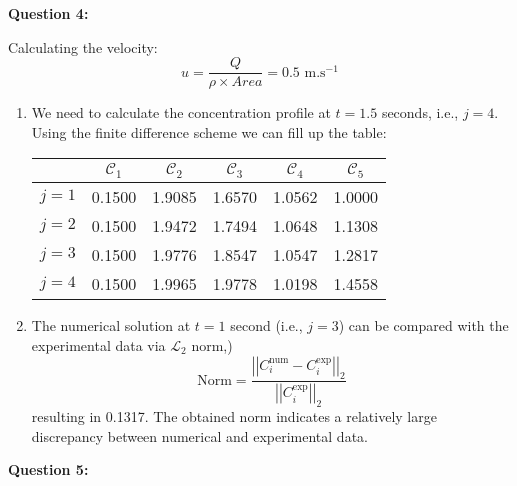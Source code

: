 \documentclass[12pts,a4paper,amsmath,amssymb,floatfix]{article}%
\newcommand{\frc}{\displaystyle\frac}
\begin{document}
\begin{flushleft}
{\bf Question 4:}
\end{flushleft}

Calculating the velocity:
\begin{displaymath}
u = \frc{Q}{\rho \times Area} = 0.5 \text{ m.s}^{-1}
\end{displaymath}

\begin{enumerate}
\item We need to calculate the concentration profile at $t=1.5$ seconds, i.e., $j = 4$.  Using the finite difference scheme we can fill up the table:
\begin{center}
\begin{tabular}{| c | c c c c c|}
\hline 
        & $\mathcal{C}_{1}$  & $\mathcal{C}_{2}$ &  $\mathcal{C}_{3}$ &  $\mathcal{C}_{4}$  & $\mathcal{C}_{5}$ \\
\hline
$j = 1$ & 0.1500             & 1.9085           & 1.6570            &  1.0562             & 1.0000            \\
$j = 2$ & 0.1500             & 1.9472           & 1.7494            &  1.0648             & 1.1308            \\
$j = 3$ & 0.1500             & 1.9776           & 1.8547            &  1.0547             & 1.2817            \\
$j = 4$ & 0.1500             & 1.9965           & 1.9778            &  1.0198             & 1.4558            \\
\hline
\end{tabular}
\end{center}

\item The numerical solution at $t=1$ second (i.e., $j=3$) can be compared with the experimental data via $\mathcal{L}_{2}$ norm,)
\begin{displaymath}
  \text{Norm} = \frc{\left|\left|C_{i}^{\text{num}}-C_{i}^{\text{exp}}\right|\right|_{2}}{\left|\left|C_{i}^{\text{exp}}\right|\right|_{2}}
\end{displaymath} 
resulting in 0.1317. The obtained norm indicates a relatively large discrepancy between numerical and experimental data.

\end{enumerate}

\clearpage

\begin{flushleft}
{\bf Question 5:}
\end{flushleft}
\end{document}
